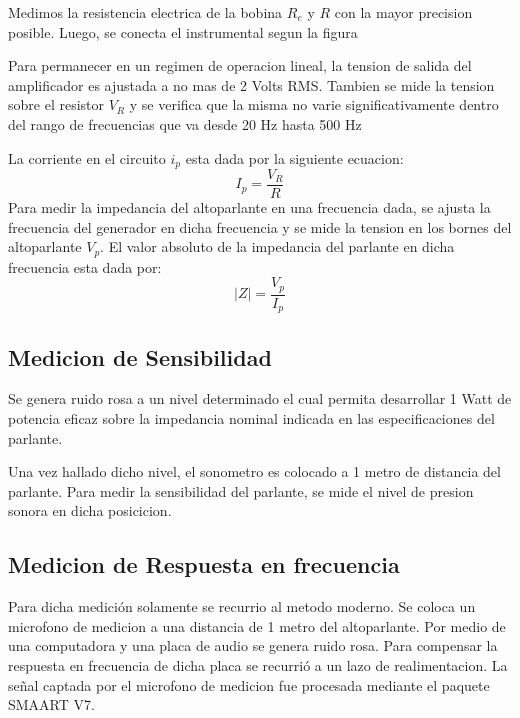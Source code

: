 \documentclass[]{article}
\makeatletter
\newcommand{\figura}[3]{
\vspace{0.2 cm}
\begin{figurehere}
\centering
\texttt{[image: \#1]}
\captionof{figure}{#2}
\label{#3}
\end{figurehere}
\vspace{0.2 cm}
}
\newenvironment{figurehere}   %
  {\def\@captype{figure}}   %
  {\par\medskip}
  {}              %
\makeatother
\begin{document}
\begin{multicols}{2}
Medimos la resistencia electrica de la bobina $R_e$ y $R$ con
la mayor precision posible. Luego, se conecta el instrumental segun la figura
%

Para permanecer en un regimen de operacion lineal, la tension de salida del
amplificador es ajustada a no mas de 2 Volts RMS.
Tambien se mide la tension sobre el resistor $V_R$ y se verifica que la misma no varie
significativamente dentro del rango de frecuencias que va desde 20 Hz hasta
500 Hz

La corriente en el circuito $i_p$ esta dada por la siguiente ecuacion:
\begin{equation}
  I_p=\frac{V_R}{R}
\end{equation}
Para medir la impedancia del altoparlante en una frecuencia dada, se ajusta la
frecuencia del generador en dicha frecuencia y se mide la tension en los bornes
del altoparlante $V_p$. El valor absoluto de la impedancia del parlante en
dicha frecuencia esta dada por:
\begin{equation}
  |Z|=\frac{V_p}{I_p}
\end{equation}



\subsection{Medicion de Sensibilidad}

Se genera ruido rosa a un nivel determinado el cual permita desarrollar 1 Watt
de potencia eficaz sobre la impedancia nominal indicada en las especificaciones
del parlante.

Una vez hallado dicho nivel, el sonometro es colocado a 1 metro de distancia del
parlante. Para medir la sensibilidad del parlante, se mide el nivel de presion
sonora en dicha posicicion.



\subsection{Medicion de Respuesta en frecuencia}
Para dicha medición solamente se recurrio al metodo moderno. Se coloca un
microfono de medicion a una distancia de 1 metro del altoparlante.
Por medio de una computadora y una placa de audio se genera ruido rosa.
Para compensar la respuesta en frecuencia de dicha placa se recurrió a un lazo
de realimentacion. La señal captada por el microfono de medicion fue procesada
mediante el paquete SMAART V7.
\label{subsec: freq response}


\end{multicols}
\end{document}
